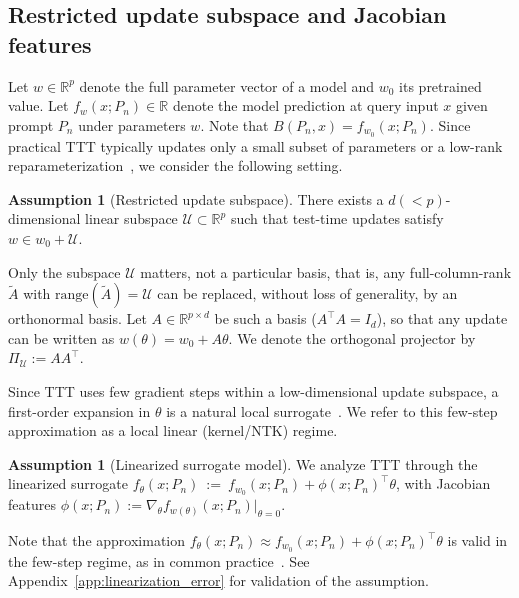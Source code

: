 \documentclass{article}
\theoremstyle{plain}
\theoremstyle{definition}
\newtheorem{assumption}[theorem]{Assumption}
\theoremstyle{remark}
\begin{document}
\subsection{Restricted update subspace and Jacobian features}
\label{subsec:update_subspace_sec3}

Let $w\in\mathbb{R}^p$ denote the full parameter vector of a model and $w_0$ its pretrained value. Let $f_w(x;P_n)\in\mathbb{R}$ denote the model prediction at query input $x$ given prompt $P_n$ under parameters $w$. Note that $B(P_n,x) = f_{w_0}(x;P_n)$. Since practical TTT typically updates only a small subset of parameters or a low-rank reparameterization~\citep{wang2021tent,pmlr-v162-niu22a,hubotter2025efficiently,hubotter2025specialization}, we consider the following setting.


\begin{assumption}[Restricted update subspace]\label{assump:update_subspace_sec3}
There exists a $d(<p)$-dimensional linear subspace $\mathcal U\subset\mathbb R^p$ such that test-time updates satisfy $w\in w_0+\mathcal U$.
\end{assumption}

 Only the subspace $\mathcal U$ matters, not a particular basis, that is, any full-column-rank $\widetilde A$ with $\mathrm{range}(\widetilde A)=\mathcal U$ can be replaced, without loss of generality, by an orthonormal basis. Let $A\in\mathbb R^{p\times d}$ be such a basis ($A^\top A=I_d$), so that any update can be written as $w(\theta)=w_0+A\theta$. We denote the orthogonal projector by $\Pi_{\mathcal U}:=AA^\top$.


Since TTT uses few gradient steps within a low-dimensional update subspace, a first-order expansion in $\theta$ is a natural local surrogate~\citep{Jacot2018NTK,Lee2019WideNNLinear,chizat2019lazy}. We refer to this few-step approximation as a local linear (kernel/NTK) regime.


\begin{assumption}[Linearized surrogate model]
\label{assump:linearization_sec3}
We analyze TTT through the linearized surrogate $f_\theta(x;P_n) \ :=\ f_{w_0}(x;P_n) + \phi(x;P_n)^\top \theta$, with Jacobian features $\phi(x;P_n) := \nabla_\theta f_{w(\theta)}(x;P_n)\big|_{\theta=0}$.
\end{assumption}

Note that the approximation $f_\theta(x;P_n) \approx f_{w_0}(x;P_n) + \phi(x;P_n)^\top \theta$ is valid in the few-step regime, as in common practice~\citep{akyurek2025the,SunEtAl2020TTT}. See Appendix~\ref{app:linearization_error} for validation of the assumption.
\end{document}
